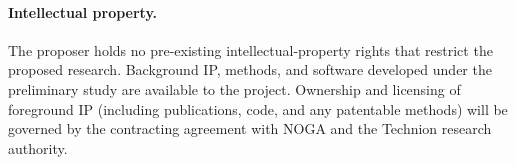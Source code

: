\documentclass[12pt,a4paper]{article}
\begin{document}
\paragraph{Intellectual property.} The proposer holds no pre-existing intellectual-property
rights that restrict the proposed research. Background IP, methods, and software developed
under the preliminary study are available to the project. Ownership and licensing of
foreground IP (including publications, code, and any patentable methods) will be governed
by the contracting agreement with NOGA and the Technion research authority.

\FloatBarrier
\newpage
\printbibliography[heading=bibintoc,title={References}]
\end{document}

